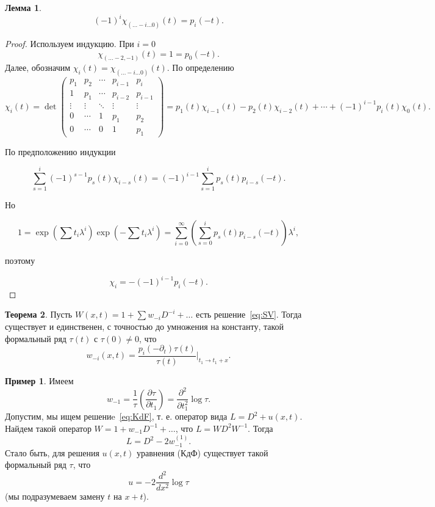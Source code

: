 \documentclass{article}
\theoremstyle{definition}
\newtheorem{theorem}{Теорема}[section]
\theoremstyle{definition} %
\theoremstyle{remark}     %
\theoremstyle{definition}
\theoremstyle{definition}
\theoremstyle{definition}
\theoremstyle{definition}
\newtheorem{lemma}[theorem]{Лемма}
\theoremstyle{definition}
\theoremstyle{definition}
\newtheorem*{example}{Пример}
\theoremstyle{definition}
\theoremstyle{definition}
\begin{document}
\begin{lemma}
  \[
    (-1)^i \chi_{(\dots - i \dots 0)}(t) = p_i(-t).
  \]
\end{lemma}

\begin{proof}
  Используем индукцию. При \(i = 0\)
  \[
    \chi_{(\dots - 2, -1)}(t) = 1 = p_0(-t).
  \]
  Далее, обозначим \(\chi_i(t) = \chi_{(\dots - i \dots 0)}(t)\). По определению
  \[
    \chi_i(t) = \det
    \begin{pmatrix}
      p_1 & p_2 & \cdots & p_{i-1} & p_i \\
      1 & p_1 & \cdots & p_{i-2} & p_{i-1} \\
      \vdots & \vdots & \ddots & \vdots & \vdots \\
      0 & \cdots & 1 & p_1 & p_2 \\
      0 & \cdots & 0 & 1 & p_1
    \end{pmatrix}
    = p_1(t) \chi_{i-1}(t) - p_2(t) \chi_{i-2}(t) + \cdots + (-1)^{i-1} p_i(t) \chi_0(t).
  \]


По предположению индукции

\[
\sum_{s=1}^{i} (-1)^{s-1} p_s(t) \chi_{i-s}(t) = (-1)^{i-1} \sum_{s=1}^{i} p_s(t) p_{i-s}(-t).
\]

Но

\[
1 = \exp\left(\sum t_i \lambda^i\right) \exp\left(-\sum t_i \lambda^i\right) = \sum_{i=0}^{\infty} \left(\sum_{s=0}^{i} p_s(t) p_{i-s}(-t)\right) \lambda^i,
\]

поэтому

\[
\chi_i = -(-1)^{i-1} p_i(-t).
\]
\end{proof}

\begin{theorem}
    Пусть \(W(x, t) = 1 + \sum w_{-i} D^{-i} + \dots\) есть решение~\ref{eq:SV}. Тогда существует и единственен, с точностью до умножения на константу, такой формальный ряд \(\tau(t)\) с \(\tau(0) \neq 0\), что
  \[
    w_{-i}(x, t) = \frac{p_i(-\partial_t)\tau(t)}{\tau(t)} \bigg|_{t_1 \to t_1+x}.
  \]
\end{theorem}

\begin{example}
  Имеем
  \[
    w_{-1} = \frac{1}{\tau} \left(\frac{\partial\tau}{\partial t_1}\right) = \frac{\partial^2}{\partial t_1^2} \log \tau.
  \]
  Допустим, мы ищем решениe~\ref{eq:KdF}, т. е. оператор вида \(L = D^2 + u(x, t)\). Найдем такой оператор \(W = 1 + w_{-1} D^{-1} + \dots\), что \(L = W D^2 W^{-1}\). Тогда
  \[
    L = D^2 - 2w_{-1}^{(1)}.
  \]
  Стало быть, для решения \(u(x, t)\) уравнения (КдФ) существует такой формальный ряд \(\tau\), что
  \[
    u = -2 \frac{d^2}{dx^2} \log \tau
  \]
  (мы подразумеваем замену \(t\) на \(x + t\)).
\end{example}
\end{document}
